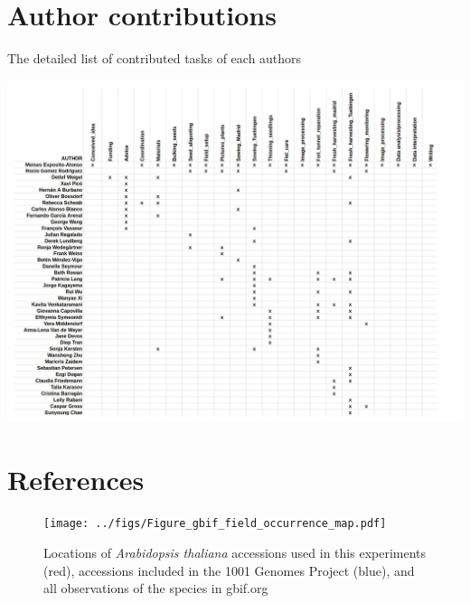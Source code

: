 \documentclass[12pt,]{article}
\begin{document}
\section{Author contributions}\label{author-contributions}

The detailed list of contributed tasks of each authors

\centerline{\includegraphics[width=7in]{../figs/People_paper.pdf}}

\section{References}\label{references}



\pagebreak

\begin{figure}
    \centerline{\texttt{[image: ../figs/Figure\_gbif\_field\_occurrence\_map.pdf]}}
    \caption{ Locations of \textit{Arabidopsis thaliana} accessions used in this experiments (red), accessions included in the 1001 Genomes Project (blue), and all observations of the species in gbif.org}
    \label{fig:ecotypes}
\end{figure}
\end{document}
